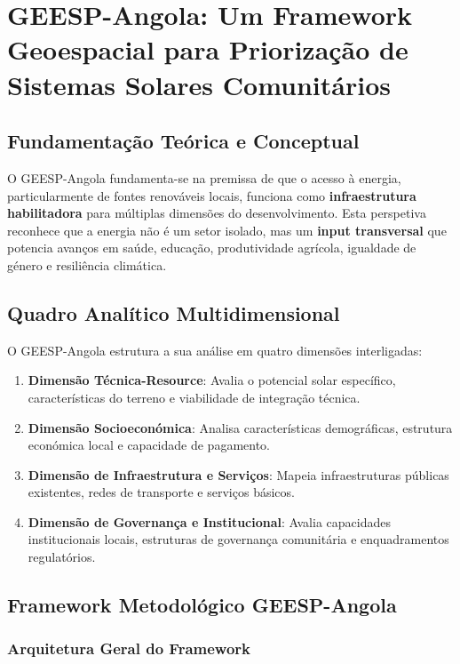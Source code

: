 \documentclass[12pt, a4paper]{article}
\begin{document}
\section{GEESP-Angola: Um Framework Geoespacial para Priorização de Sistemas Solares Comunitários}

\subsection{Fundamentação Teórica e Conceptual}

O GEESP-Angola fundamenta-se na premissa de que o acesso à energia, particularmente de fontes renováveis locais, funciona como \textbf{infraestrutura habilitadora} para múltiplas dimensões do desenvolvimento. Esta perspetiva reconhece que a energia não é um setor isolado, mas um \textbf{input transversal} que potencia avanços em saúde, educação, produtividade agrícola, igualdade de género e resiliência climática.

\subsection{Quadro Analítico Multidimensional}

O GEESP-Angola estrutura a sua análise em quatro dimensões interligadas:
\begin{enumerate}
\item \textbf{Dimensão Técnica-Resource}: Avalia o potencial solar específico, características do terreno e viabilidade de integração técnica.
\item \textbf{Dimensão Socioeconómica}: Analisa características demográficas, estrutura económica local e capacidade de pagamento.
\item \textbf{Dimensão de Infraestrutura e Serviços}: Mapeia infraestruturas públicas existentes, redes de transporte e serviços básicos.
\item \textbf{Dimensão de Governança e Institucional}: Avalia capacidades institucionais locais, estruturas de governança comunitária e enquadramentos regulatórios.
\end{enumerate}

\subsection{Framework Metodológico GEESP-Angola}

\subsubsection{Arquitetura Geral do Framework}
\end{document}
